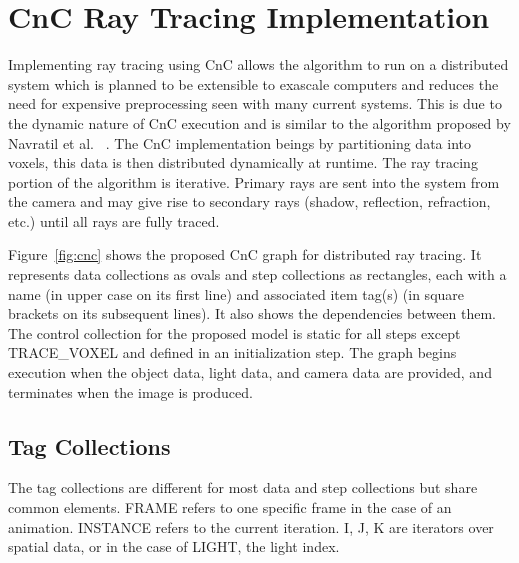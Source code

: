 \section{CnC Ray Tracing Implementation}

Implementing ray tracing using CnC allows the algorithm to run on a
distributed system which is planned to be extensible to exascale
computers and reduces the need for expensive preprocessing seen with
many current systems. This is due to the dynamic nature of CnC
execution and is similar to the algorithm proposed by Navratil et al.
~\cite{navratil2014dynamic}. The CnC implementation beings by
partitioning data into voxels, this data is then distributed
dynamically at runtime.
The ray tracing portion of the algorithm is
iterative. Primary rays are sent into the system from the camera and
may give rise to secondary rays (shadow, reflection, refraction, etc.)
until all rays are fully traced.

Figure~\ref{fig:cnc} shows the proposed CnC graph for distributed ray
tracing.
It represents data collections as ovals and step collections
as rectangles, each with a name
(in upper case on its first line) and associated item tag(s) (in
square brackets on its subsequent lines). It also shows the
dependencies between them. The control collection for the proposed
model is static for all steps except TRACE\_VOXEL
and defined in an initialization step. The graph begins
execution when the object data, light data, and camera data are
provided, and terminates when the image is produced.

\subsection{Tag Collections}

The tag collections are different for most data and step collections
but share common elements. FRAME refers to one specific frame in the
case of an animation. INSTANCE refers to the current iteration.
I, J, K are iterators over spatial data, or in the case of LIGHT, the
light index.

